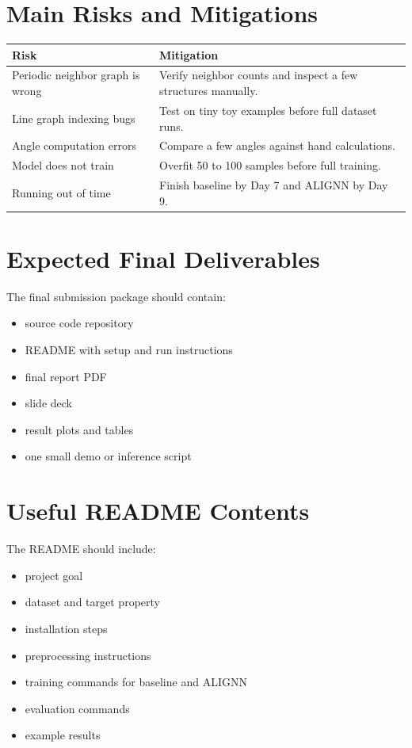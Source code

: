 \documentclass[12pt]{article}
\begin{document}
\section{Main Risks and Mitigations}
\begin{tabular}{p{} p{}}
\toprule
Risk & Mitigation \\
\midrule
Periodic neighbor graph is wrong & Verify neighbor counts and inspect a few structures manually. \\
Line graph indexing bugs & Test on tiny toy examples before full dataset runs. \\
Angle computation errors & Compare a few angles against hand calculations. \\
Model does not train & Overfit 50 to 100 samples before full training. \\
Running out of time & Finish baseline by Day 7 and ALIGNN by Day 9. \\
\bottomrule
\end{tabular}

\section{Expected Final Deliverables}
The final submission package should contain:

\begin{itemize}
    \item source code repository
    \item README with setup and run instructions
    \item final report PDF
    \item slide deck
    \item result plots and tables
    \item one small demo or inference script
\end{itemize}

\section{Useful README Contents}
The README should include:

\begin{itemize}
    \item project goal
    \item dataset and target property
    \item installation steps
    \item preprocessing instructions
    \item training commands for baseline and ALIGNN
    \item evaluation commands
    \item example results
\end{itemize}
\end{document}
